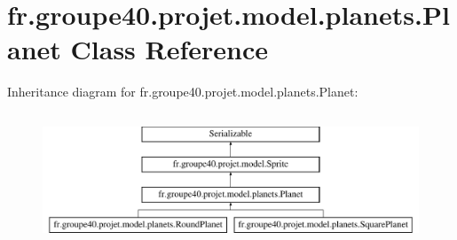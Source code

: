 \hypertarget{classfr_1_1groupe40_1_1projet_1_1model_1_1planets_1_1_planet}{}\section{fr.\+groupe40.\+projet.\+model.\+planets.\+Planet Class Reference}
\label{classfr_1_1groupe40_1_1projet_1_1model_1_1planets_1_1_planet}
Inheritance diagram for fr.\+groupe40.\+projet.\+model.\+planets.\+Planet\+:\begin{figure}[H]
\begin{center}
\leavevmode
\includegraphics[height=3.957597cm]{classfr_1_1groupe40_1_1projet_1_1model_1_1planets_1_1_planet}
\end{center}
\end{figure}
